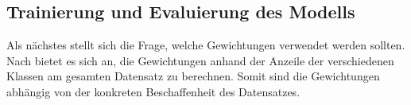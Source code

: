 \subsection{Trainierung und Evaluierung des Modells}
\label{sec:TrainingEvaluierung}

Als nächstes stellt sich die Frage, welche Gewichtungen verwendet werden sollten.
Nach \cite{KerasImbalancedData} bietet es sich an, die Gewichtungen anhand der Anzeile der verschiedenen Klassen am gesamten Datensatz zu berechnen.
Somit sind die Gewichtungen abhängig von der konkreten Beschaffenheit des Datensatzes.

